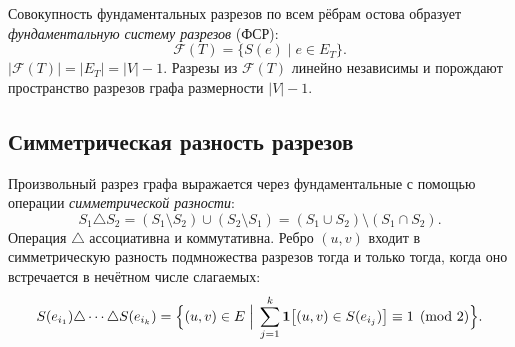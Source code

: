 Совокупность фундаментальных разрезов по всем рёбрам остова
образует \textit{фундаментальную систему разрезов} (ФСР):
\[
    \mathcal{F}(T) = \bigl\{S(e) \mid e \in E_T\bigr\}.
\]
$|\mathcal{F}(T)| = |E_T| = |V| - 1$.
Разрезы из $\mathcal{F}(T)$ линейно независимы
и порождают пространство разрезов графа размерности $|V|-1$.

\subsection{Симметрическая разность разрезов}

Произвольный разрез графа выражается через фундаментальные
с помощью операции \textit{симметрической разности}:
\[
    S_1 \triangle S_2 = (S_1 \setminus S_2) \cup (S_2 \setminus S_1)
                      = (S_1 \cup S_2) \setminus (S_1 \cap S_2).
\]
Операция $\triangle$ ассоциативна и коммутативна. Ребро $(u,v)$ входит в симметрическую разность
подмножества разрезов тогда и только тогда, когда оно встречается
в нечётном числе слагаемых:
\[
    S(e_{i_1}) \triangle \cdots \triangle S(e_{i_k})
    = \Bigl\{(u,v) \in E \;\Big|\;
      \sum_{j=1}^{k} \mathbf{1}\bigl[(u,v) \in S(e_{i_j})\bigr]
      \equiv 1 \pmod{2}\Bigr\}.
\]
